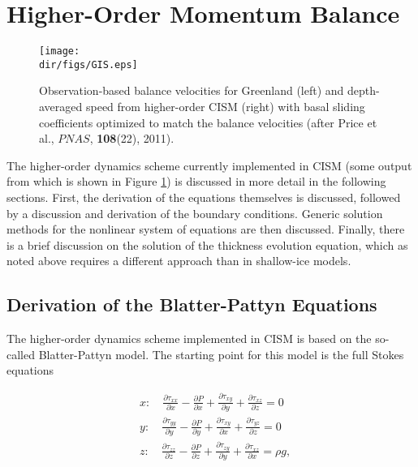 
\section{Higher-Order Momentum Balance}
\label{sc:higher-order-mom}

\begin{figure}
  \begin{center}
    \texttt{[image: \\dir/figs/GIS.eps]}
   \end{center}
  \caption{Observation-based balance velocities for Greenland (left) and depth-averaged speed from higher-order CISM (right) with basal sliding coefficients optimized to match the balance velocities (after Price et al., $PNAS$, \textbf{108}(22), 2011).}
  \label{fig:GIS_PNAS}
\end{figure} 

The higher-order dynamics scheme currently implemented in CISM (some output from which is shown in Figure \ref{fig:GIS_PNAS}) is discussed in more detail in the following sections. First, the derivation of the equations themselves is discussed, followed by a discussion and derivation of the boundary conditions. Generic solution methods for the nonlinear system of equations are then discussed. Finally, there is a brief discussion on the solution of the thickness evolution equation, which as noted above requires a different approach than in shallow-ice models.

\subsection{Derivation of the Blatter-Pattyn Equations}

The higher-order dynamics scheme implemented in CISM is based on the so-called Blatter-Pattyn model. The starting point for this model is the full Stokes equations

\begin{align*}
  & x:\quad \frac{\partial \tau _{xx}}{\partial x}-\frac{\partial P}{\partial x}+\frac{\partial \tau _{xy}}{\partial y}+\frac{\partial \tau _{xz}}{\partial z}=0 \\ 
 & y:\quad \frac{\partial \tau _{yy}}{\partial y}-\frac{\partial P}{\partial y}+\frac{\partial \tau _{xy}}{\partial x}+\frac{\partial \tau _{yz}}{\partial z}=0 \\ 
 & z:\quad \frac{\partial \tau _{zz}}{\partial z}-\frac{\partial P}{\partial z}+\frac{\partial \tau _{zy}}{\partial y}+\frac{\partial \tau _{xz}}{\partial x}=\rho g, \\ 
\end{align*}

